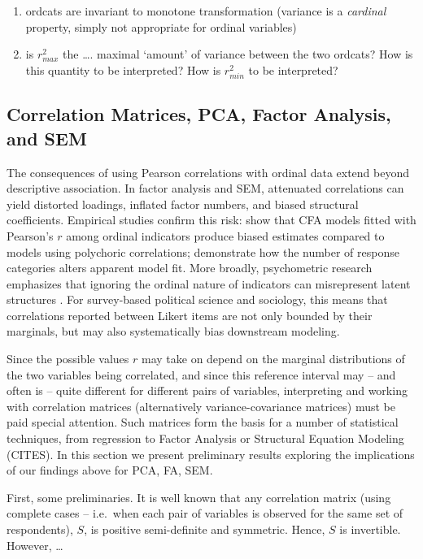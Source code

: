 \documentclass[
  12pt,
]{article}
\providecommand{\tightlist}{%
  \setlength{\itemsep}{0pt}\setlength{\parskip}{0pt}}
\theoremstyle{plain}
\theoremstyle{definition}
\theoremstyle{remark}
\begin{document}
\begin{enumerate}
\def\labelenumi{\arabic{enumi}.}
\tightlist
\item
  ordcats are invariant to monotone transformation (variance is a
  \emph{cardinal} property, simply not appropriate for ordinal
  variables)
\item
  is \(r^2_{max}\) the \ldots. maximal `amount' of variance between the
  two ordcats? How is this quantity to be interpreted? How is
  \(r^2_{min}\) to be interpreted?
\end{enumerate}

\subsection{Correlation Matrices, PCA, Factor Analysis, and
SEM}\label{sec-matrices}

The consequences of using Pearson correlations with ordinal data extend
beyond descriptive association. In factor analysis and SEM, attenuated
correlations can yield distorted loadings, inflated factor numbers, and
biased structural coefficients. Empirical studies confirm this risk:
\autocite{flor04-empirical} show that CFA models fitted with Pearson's
\(r\) among ordinal indicators produce biased estimates compared to
models using polychoric correlations; \autocite{gree97-effect}
demonstrate how the number of response categories alters apparent model
fit. More broadly, psychometric research emphasizes that ignoring the
ordinal nature of indicators can misrepresent latent structures
\autocite{lord52-theory,muth84-general,bart11-latent}. For survey-based
political science and sociology, this means that correlations reported
between Likert items are not only bounded by their marginals, but may
also systematically bias downstream modeling.

Since the possible values \(r\) may take on depend on the marginal
distributions of the two variables being correlated, and since this
reference interval may -- and often is -- quite different for different
pairs of variables, interpreting and working with correlation matrices
(alternatively variance-covariance matrices) must be paid special
attention. Such matrices form the basis for a number of statistical
techniques, from regression to Factor Analysis or Structural Equation
Modeling (CITES). In this section we present preliminary results
exploring the implications of our findings above for PCA, FA, SEM.

First, some preliminaries. It is well known that any correlation matrix
(using complete cases -- i.e.~when each pair of variables is observed
for the same set of respondents), \(S\), is positive semi-definite and
symmetric. Hence, \(S\) is invertible. However, \ldots{}
\end{document}
